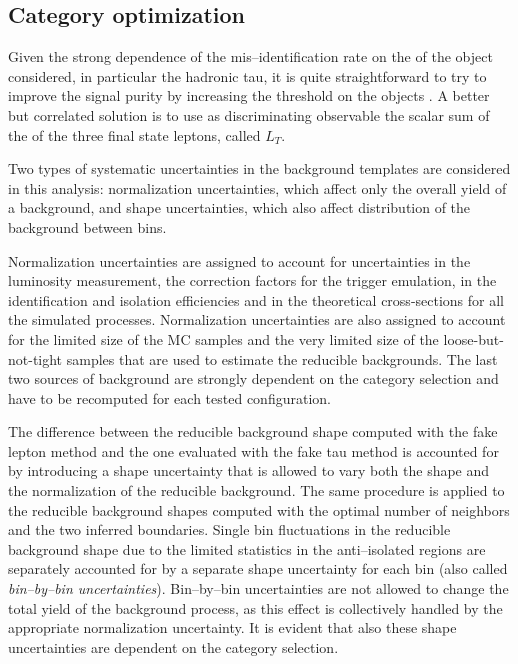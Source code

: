 \subsection{Category optimization}

Given the strong dependence of the mis--identification rate on the \pT of the object considered, in particular the hadronic tau, it is quite straightforward to try to improve the signal purity by increasing the threshold on the objects \pT. A better but correlated solution is to use as discriminating observable the scalar sum of the \pT of the three final state leptons, called $L_T$.  

Two types of systematic uncertainties in the background templates are considered in this analysis: normalization uncertainties, which affect only the overall yield of a background, and shape uncertainties, which also affect distribution of the background between bins.

Normalization uncertainties are assigned to account for uncertainties in the luminosity measurement, the correction factors for the trigger emulation, in the identification and isolation efficiencies and in the theoretical cross-sections for all the simulated processes. Normalization uncertainties are also assigned to account for the limited size of the MC samples and the very limited size of the loose-but-not-tight samples that are used to estimate the reducible backgrounds. The last two sources of background are strongly dependent on the category selection and have to be recomputed for each tested configuration.

The difference between the reducible background shape computed with the fake lepton method and the one evaluated with the fake tau method is accounted for by introducing a shape uncertainty that is allowed to vary both the shape and the normalization of the reducible background. 
The same procedure is applied to the reducible background shapes computed with the optimal number of neighbors and the two inferred boundaries. 
Single bin fluctuations in the reducible background shape due to the limited statistics in the anti--isolated regions are separately accounted for by a separate shape uncertainty for each bin (also called \emph{bin--by--bin uncertainties}). Bin--by--bin uncertainties are not allowed to change the total yield of the background process, as this effect is collectively handled by the appropriate normalization uncertainty. It is evident that also these shape uncertainties are dependent on the category selection.

